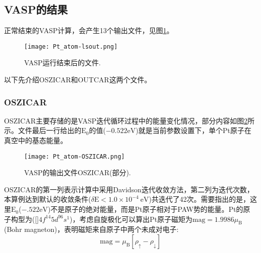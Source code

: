 \subsection{\rm{VASP}的结果}
正常结束的\textrm{VASP}计算，会产生13个输出文件，见图\ref{Pt_atom:lsout}。
\begin{figure}[h!]
\centering
\vskip -5pt
\texttt{[image: Pt\_atom-lsout.png]}
\caption{\small \textrm{VASP}运行结束后的文件.}%
\label{Pt_atom:lsout}
\end{figure}

以下先介绍\textrm{OSZICAR}和\textrm{OUTCAR}这两个文件。
\subsubsection{\rm{OSZICAR}}
\textrm{OSZICAR}主要存储的是\textrm{VASP}迭代循环过程中的能量变化情况，部分内容如图\ref{Pt_atom:OSZICAR}所示。文件最后一行给出的$\mathrm{E}_0$的值($-0.522\mathrm{eV}$)就是当前参数设置下，单个\textrm{Pt}原子在真空中的基态能量。
\begin{figure}[h!]
\centering
\texttt{[image: Pt\_atom-OSZICAR.png]}
\caption{\small \textrm{VASP}的输出文件\textrm{OSZICAR}(部分).}%
\label{Pt_atom:OSZICAR}
\end{figure}

\textrm{OSZICAR}的第一列表示计算中采用\textrm{Davidson}迭代收敛方法，第二列为迭代次数，本算例达到默认的收敛条件($\delta\mathrm{E}<1.0\times10^{-4}~\mathrm{eV}$)共迭代了42次。需要指出的是，这里$\mathrm{E}_0$($-.522\mathrm{eV}$)不是原子的绝对能量，而是\textrm{Pt}原子相对于\textrm{PAW}势的能量。\textrm{Pt}的原子构型为([]$4\mathit{f}^{14}5\mathit{d}^96\mathit{s}^1$)，考虑自旋极化可以算出\textrm{Pt}原子磁矩为$\mathrm{mag}=1.9986\mu_{\mathrm{B}}$(\textrm{Bohr magneton})，表明磁矩来自原子中两个未成对电子:
\begin{displaymath}
	\mathrm{mag}=\mu_{\mathrm{B}}[\rho_{\uparrow}-\rho_{\downarrow}]
\end{displaymath}
